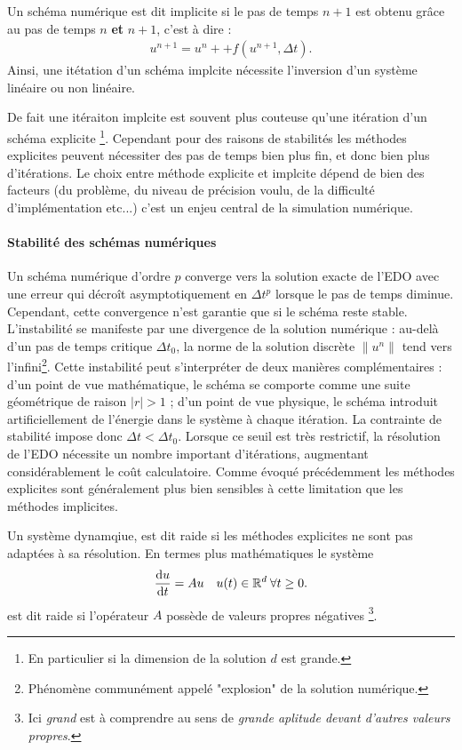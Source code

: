 \begin{definition}
    Un schéma numérique est dit implicite si le pas de temps $n+1$ est obtenu grâce au pas de temps $n$ \textbf{et} $n+1$, c'est à dire : 
    \begin{align}
        u^{n+1} = u^n + + f(u^{n+1} ,\Delta t ).
    \end{align}
    Ainsi, une itétation d'un schéma implcite nécessite l'inversion d'un système linéaire ou non linéaire. 
\end{definition}
De fait une itéraiton implcite est souvent plus couteuse qu'une itération d'un schéma explicite
\footnote{En particulier si la dimension de la solution $d$ est grande.}. 
Cependant pour des raisons de stabilités les méthodes explicites peuvent nécessiter des pas de temps bien plus fin, et donc bien plus d'itérations.
Le choix entre méthode explicite et implcite dépend de bien des facteurs (du problème, du niveau de précision voulu, de la difficulté d'implémentation etc...)
c'est un enjeu central de la simulation numérique.
\paragraph{Stabilité des schémas numériques}
Un schéma numérique d'ordre $p$ converge vers la solution exacte de l'EDO avec une erreur qui décroît asymptotiquement en $\Delta t^p$ lorsque le pas de temps diminue.
Cependant, cette convergence n'est garantie que si le schéma reste stable.
L'instabilité se manifeste par une divergence de la solution numérique : au-delà d'un pas de temps critique $\Delta t_0$, la norme de la solution discrète $\|u^n\|$ tend vers l'infini\footnote{Phénomène communément appelé "explosion" de la solution numérique.}.
Cette instabilité peut s'interpréter de deux manières complémentaires : d'un point de vue mathématique, le schéma se comporte comme une suite géométrique de raison $|r| > 1$ ; d'un point de vue physique, le schéma introduit artificiellement de l'énergie dans le système à chaque itération.
La contrainte de stabilité impose donc $\Delta t < \Delta t_0$. Lorsque ce seuil est très restrictif, la résolution de l'EDO nécessite un nombre important d'itérations, augmentant considérablement le coût calculatoire. 
Comme évoqué précédemment les méthodes explicites sont généralement plus bien sensibles à cette limitation que les méthodes implicites.

\begin{definition}
    Un système dynamqiue, est dit raide si les méthodes explicites ne sont pas adaptées à sa résolution.
    En termes plus mathématiques le système 
    \begin{align}
    \frac{\text d u}{\text{d}t} = A u \quad u(t) \in \mathbb{R}^d \: \forall t\geq 0.
    \end{align}
    est dit raide si l'opérateur $A$ possède de  valeurs propres négatives
    \footnote{Ici \textit{grand} est à comprendre au sens de \textit{grande aplitude devant d'autres valeurs propres}.}.
\end{definition}

